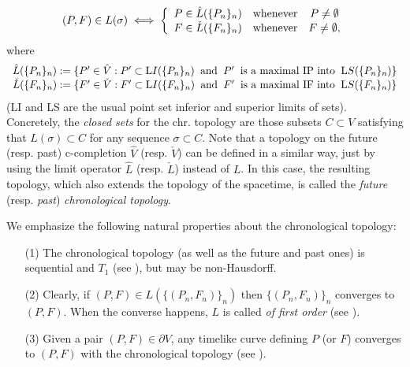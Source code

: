 \begin{equation}
  \label{eq:29}
(P,F)\in L(\sigma)\iff\left\{ \begin{array}{ccc} P\in \hat{L}(\{P_n\}_n) & \hbox{whenever} &  P\neq \emptyset\\ F\in \check{L}(\{F_n\}_n) & \hbox{whenever} & F\neq \emptyset, \end{array}\right.
\end{equation}
 where
\begin{equation}\label{limcrono}
\begin{array}{c}
\hat{L}(\{P_{n}\}_n):=\{P'\in\hat{V}: P'\subset {\mathrm
LI}(\{P_{n}\}_n)\;\;\hbox{and}\;\; P'\;\;\hbox{is a maximal IP into}\;\; {\mathrm LS}(\{P_{n}\}_n)\} \\
\check{L}(\{F_{n}\}_n):=\{F'\in\check{V}: F'\subset {\mathrm
LI}(\{F_{n}\}_n)\;\;\hbox{and}\;\; F'\;\;\hbox{is a maximal IF
into}\;\; {\mathrm LS}(\{F_{n}\}_n)\}
\end{array}
\end{equation}
(LI and LS are the usual point set inferior and superior limits of
sets).
Concretely, the {\em closed sets} for the chr. topology are those subsets $C\subset V$ satisfying that $L(\sigma)\subset C$ for any sequence $\sigma\subset C$. Note that a topology on the future (resp. past) c-completion
$\hat{V}$ (resp. $\check{V}$) can be defined in a similar way,
just by using the limit operator $\hat{L}$ (resp. $\check{L}$)
instead of $L$. In this case, the resulting topology, which also
extends the topology of the spacetime, is called the {\em future}
(resp. {\em past}) {\em chronological topology}.
\begin{rem}\label{propsimplepunt} {\rm We emphasize
the following natural properties about the chronological topology:
\begin{itemize}
\item[(1)] The chronological topology (as well as the future and
past ones) is sequential and $T_1$ (see \cite[Prop. 3.39 and 3.21]{FHSFinalDef}), but may
be non-Hausdorff.

\item[(2)] Clearly, if $(P,F)\in L(\{(P_{n},F_{n})\}_n)$ then
$\{(P_{n},F_{n})\}_n$ converges to $(P,F)$. When the  converse
happens, $L$ is called {\em of first order} (see \cite[Section
3.6]{FHSFinalDef}).

\item[(3)] Given a pair $(P,F)\in \partial V$, any timelike curve
defining $P$ (or $F$) converges to $(P,F)$ with the chronological
topology (see \cite[Th. 3.27]{FHSFinalDef}).
\end{itemize}
}
\end{rem}

